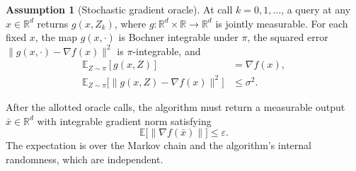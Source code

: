 \documentclass[10pt]{article}
\theoremstyle{definition}
\newtheorem{assumption}{Assumption}
\begin{document}
\begin{assumption}[Stochastic gradient oracle]
At call $k=0,1,\ldots$, a query at any $x\in\mathbb{R}^d$ returns $g(x,Z_k)$, where $g:\mathbb{R}^d\times\mathbb{R}\to\mathbb{R}^d$ is jointly measurable. For each fixed $x$, the map $g(x,\cdot)$ is Bochner integrable under $\pi$, the squared error $\|g(x,\cdot)-\nabla f(x)\|^2$ is $\pi$-integrable, and
\[
\begin{aligned}
\mathbb{E}_{Z\sim\pi}[g(x,Z)]&=\nabla f(x),\\
\mathbb{E}_{Z\sim\pi}\bigl[\|g(x,Z)-\nabla f(x)\|^2\bigr]&\leq\sigma^2.
\end{aligned}
\]
\end{assumption}

After the allotted oracle calls, the algorithm must return a measurable output $\bar{x}\in\mathbb{R}^d$ with integrable gradient norm satisfying
\[
\mathbb{E}\bigl[\|\nabla f(\bar{x})\|\bigr]\leq\varepsilon.
\]
The expectation is over the Markov chain and the algorithm's internal randomness, which are independent.
\end{document}

